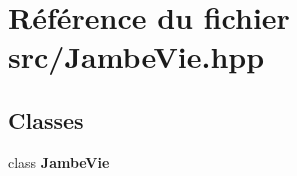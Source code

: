\section{Référence du fichier src/\-Jambe\-Vie.hpp}
\label{_jambe_vie_8hpp}
\subsection*{Classes}
\begin{DoxyCompactItemize}
\item 
class {\bf Jambe\-Vie}
\end{DoxyCompactItemize}
